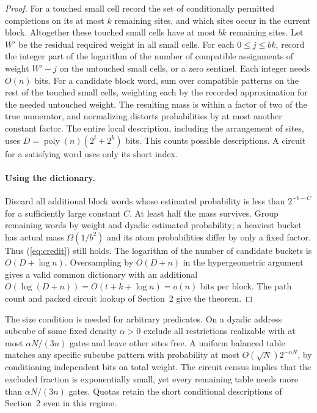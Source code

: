\begin{proof}
For a touched small cell record the set of conditionally permitted completions on its at most $k$ remaining sites, and which sites occur in the current block. Altogether these touched small cells have at most $bk$ remaining sites. Let $W'$ be the residual required weight in all small cells. For each $0\le j\le bk$, record the integer part of the logarithm of the number of compatible assignments of weight $W'-j$ on the untouched small cells, or a zero sentinel. Each integer needs $O(n)$ bits. For a candidate block word, sum over compatible patterns on the rest of the touched small cells, weighting each by the recorded approximation for the needed untouched weight. The resulting mass is within a factor of two of the true numerator, and normalizing distorts probabilities by at most another constant factor. The entire local description, including the arrangement of sites, uses $D=\operatorname{poly}(n)(2^t+2^k)$ bits. This counts possible descriptions. A circuit for a satisfying word uses only its short index.

\paragraph{Using the dictionary.} Discard all additional block words whose estimated probability is less than $2^{-b-C}$ for a sufficiently large constant $C$. At least half the mass survives. Group remaining words by weight and dyadic estimated probability; a heaviest bucket has actual mass $\Omega(1/b^2)$ and its atom probabilities differ by only a fixed factor. Thus (\ref{eq:credit}) still holds. The logarithm of the number of candidate buckets is $O(D+\log n)$. Oversampling by $O(D+n)$ in the hypergeometric argument gives a valid common dictionary with an additional $O(\log(D+n))=O(t+k+\log n)=o(n)$ bits per block. The path count and packed circuit lookup of Section~2 give the theorem.
\end{proof}
The size condition is needed for arbitrary predicates. On a dyadic address subcube of some fixed density $\alpha>0$ exclude all restrictions realizable with at most $\alpha N/(3n)$ gates and leave other sites free. A uniform balanced table matches any specific subcube pattern with probability at most $O(\sqrt N)2^{-\alpha N}$, by conditioning independent bits on total weight. The circuit census implies that the excluded fraction is exponentially small, yet every remaining table needs more than $\alpha N/(3n)$ gates. Quotas retain the short conditional descriptions of Section~2 even in this regime.
